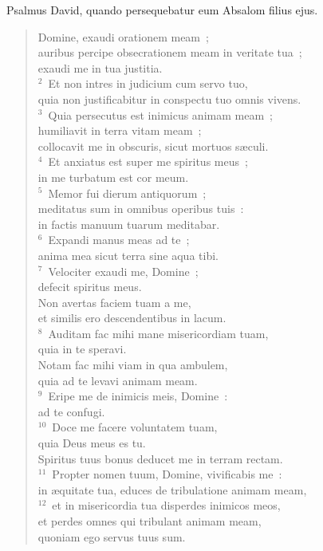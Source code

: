 \lettrine[lines=3,image=true,loversize=0.05,lraise=-0.03]{P}{}salmus David, quando persequebatur eum Absalom filius ejus. \begin{flushleft}\begin{verse}\vspace{6pt}Domine, exaudi orationem meam~;\\ auribus percipe obsecrationem meam in veritate tua~;\\ exaudi me in tua justitia.\\
${}^{2}$~Et non intres in judicium cum servo tuo,\\ quia non justificabitur in conspectu tuo omnis vivens.\\
${}^{3}$~Quia persecutus est inimicus animam meam~;\\ humiliavit in terra vitam meam~;\\ collocavit me in obscuris, sicut mortuos s\ae culi.\\
${}^{4}$~Et anxiatus est super me spiritus meus~;\\ in me turbatum est cor meum.\\
${}^{5}$~Memor fui dierum antiquorum~;\\ meditatus sum in omnibus operibus tuis~:\\ in factis manuum tuarum meditabar.\\
${}^{6}$~Expandi manus meas ad te~;\\ anima mea sicut terra sine aqua tibi.\\
${}^{7}$~Velociter exaudi me, Domine~;\\ defecit spiritus meus.\\ Non avertas faciem tuam a me,\\ et similis ero descendentibus in lacum.\\
${}^{8}$~Auditam fac mihi mane misericordiam tuam,\\ quia in te speravi.\\ Notam fac mihi viam in qua ambulem,\\ quia ad te levavi animam meam.\\
${}^{9}$~Eripe me de inimicis meis, Domine~:\\ ad te confugi.\\
${}^{10}$~Doce me facere voluntatem tuam,\\ quia Deus meus es tu.\\ Spiritus tuus bonus deducet me in terram rectam.\\
${}^{11}$~Propter nomen tuum, Domine, vivificabis me~:\\ in \ae quitate tua, educes de tribulatione animam meam,\\
${}^{12}$~et in misericordia tua disperdes inimicos meos,\\ et perdes omnes qui tribulant animam meam,\\ quoniam ego servus tuus sum.\end{verse}\end{flushleft}



